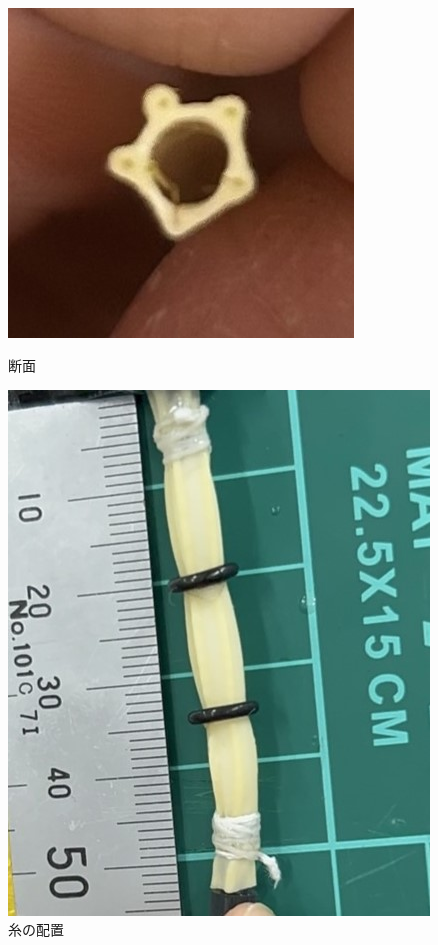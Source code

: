 　\begin{figure}[htbp]
  \centering
  \begin{minipage}[b]{0.49\hsize}
      \centering
      \includegraphics[scale=0.5]{pic/2sou.jpg}
      \caption{断面}
      \label{fig:2sou}
  \end{minipage} \hfill
  \begin{minipage}[b]{0.49\hsize}
      \centering
      \includegraphics[scale=0.4]{pic/kutu.jpg}
      \caption{糸の配置}
      \label{fig:kutu}
  \end{minipage} 
\end{figure}


